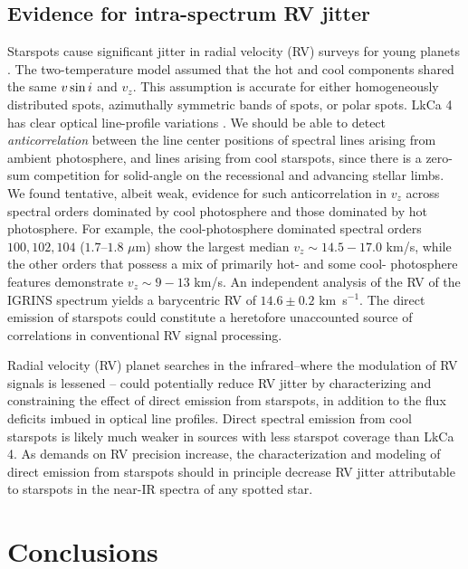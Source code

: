 \documentclass[twocolumn]{emulateapj}%
\begin{document}
\subsection{Evidence for intra-spectrum RV jitter}
Starspots cause significant jitter in radial velocity (RV) surveys for young planets \citep[e.g.][]{donati14, robertson14}.  The two-temperature model assumed that the hot and cool components shared the same $v \sin i$ and $v_z$.  This assumption is accurate for either homogeneously distributed spots, azimuthally symmetric bands of spots, or polar spots.  LkCa 4 has clear optical line-profile variations \citep{nguyen12, donati14}.  We should be able to detect \emph{anticorrelation} between the line center positions of spectral lines arising from ambient photosphere, and lines arising from cool starspots, since there is a zero-sum competition for solid-angle on the recessional and advancing stellar limbs.  We found tentative, albeit weak, evidence for such anticorrelation in $v_z$ across spectral orders dominated by cool photosphere and those dominated by hot photosphere.  For example, the cool-photosphere dominated spectral orders $100, 102, 104$ ($1.7$--$1.8$ $\mu$m) show the largest median $v_z\sim14.5-17.0$ km/s, while the other orders that possess a mix of primarily hot- and some cool- photosphere features demonstrate $v_z\sim9-13$ km/s.  An independent analysis of the RV of the IGRINS spectrum yields a barycentric RV of $14.6\pm0.2$ km~s$^{-1}$.  The direct emission of starspots could constitute a heretofore unaccounted source of correlations in conventional RV signal processing.

Radial velocity (RV) planet searches in the infrared--where the modulation of RV signals is lessened \citep[\emph{e.g.}][]{prato08,crockett12}-- could potentially reduce RV jitter by characterizing and constraining the effect of direct emission from starspots, in addition to the flux deficits imbued in optical line profiles.  Direct spectral emission from cool starspots is likely much weaker in sources with less starspot coverage than LkCa 4.  As demands on RV precision increase, the characterization and modeling of direct emission from starspots should in principle decrease RV jitter attributable to starspots in the near-IR spectra of any spotted star.


\section{Conclusions}
\end{document}
